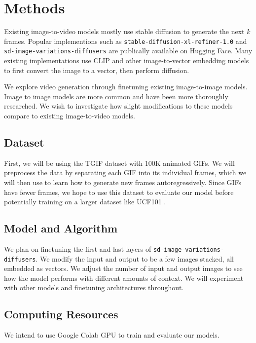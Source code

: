 \documentclass[11pt,a4paper]{article}
\begin{document}
\section{Methods}

Existing image-to-video models mostly use stable diffusion to generate the next $k$ frames. Popular implementions such as \verb+stable-diffusion-xl-refiner-1.0+ and \verb+sd-image-variations-diffusers+ are publically available on Hugging Face. Many existing implementations use CLIP and other image-to-vector embedding models to first convert the image to a vector, then perform diffusion.

We explore video generation through finetuning existing image-to-image models. Image to image models are more common and have been more thoroughly researched. We wish to investigate how slight modifications to these models compare to existing image-to-video models. 

\subsection{Dataset}

First, we will be using the TGIF dataset \cite{li2016tgif} with 100K animated GIFs. We will preprocess the data by separating each GIF into its individual frames, which we will then use to learn how to generate new frames autoregressively. Since GIFs have fewer frames, we hope to use this dataset to evaluate our model before potentially training on a larger dataset like UCF101 \cite{soomro2012ucf101}.

\subsection{Model and Algorithm}

We plan on finetuning the first and last layers of \verb+sd-image-variations-diffusers+. We modify the input and output to be a few images stacked, all embedded as vectors. We adjust the number of input and output images to see how the model performs with different amounts of context. We will experiment with other models and finetuning architectures throughout.

\subsection{Computing Resources}

We intend to use Google Colab GPU to train and evaluate our models.
\end{document}
